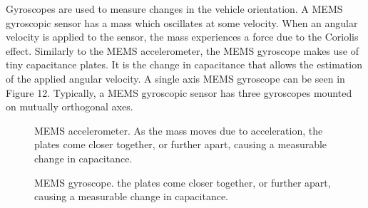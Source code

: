 \documentclass[a4paper]{article}
\begin{document}
Gyroscopes are used to measure changes in the vehicle orientation. A MEMS gyroscopic sensor has a mass which oscillates at some velocity. When an angular velocity is applied to the sensor, the mass experiences a force due to the Coriolis effect. Similarly to the MEMS accelerometer, the MEMS gyroscope makes use of tiny capacitance plates. It is the change in capacitance that allows the estimation of the applied angular velocity. A single axis MEMS gyroscope can be seen in Figure 12. Typically, a MEMS gyroscopic sensor has three gyroscopes mounted on mutually orthogonal axes. 
\begin{figure}[h]
\hspace{0.5cm}
\begin{minipage}[t]{0.40\textwidth}
\centering
{}
\caption{MEMS accelerometer. As the mass moves due to acceleration, the plates come closer together, or further apart, causing a measurable change in capacitance.}
\end{minipage}
\hspace{3cm}
\begin{minipage}[t]{0.3\textwidth}
\centering
{}
\caption{MEMS gyroscope. the plates come closer together, or further apart, causing a measurable change in capacitance.}
\end{minipage}
\end{figure}
\end{document}
